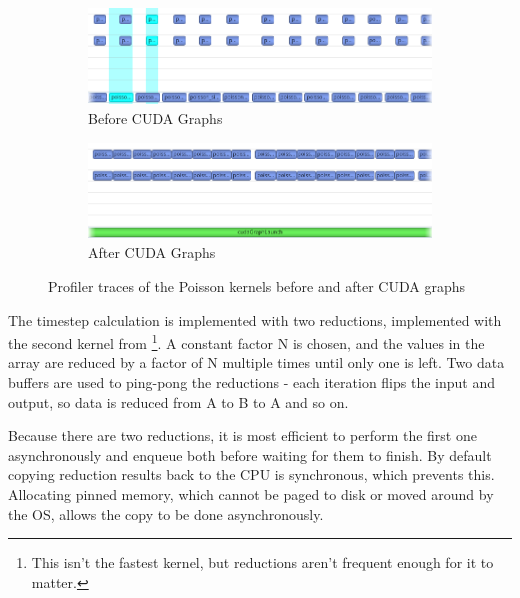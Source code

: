 \begin{figure}
    \centering
    \begin{subfigure}{\textwidth}
        \includegraphics[width=\textwidth]{Ch48Implementation/figures/cudagraphs_before.png}
        \caption{Before CUDA Graphs}
    \end{subfigure}
    \vspace{1cm}
    \begin{subfigure}{\textwidth}
        \includegraphics[width=\textwidth]{Ch48Implementation/figures/cudagraphs_after.png}
        \caption{After CUDA Graphs}
    \end{subfigure}
    \caption{Profiler traces of the Poisson kernels before and after CUDA graphs}
    \label{fig:CudaGraphsImpact}
\end{figure}

The timestep calculation is implemented with two reductions, implemented with the second kernel from \cite{CUDAParallelReduction}\footnote{This isn't the fastest kernel, but reductions aren't frequent enough for it to matter.}.
A constant factor N is chosen, and the values in the array are reduced by a factor of N multiple times until only one is left.
Two data buffers are used to ping-pong the reductions - each iteration flips the input and output, so data is reduced from A to B to A and so on.

Because there are two reductions, it is most efficient to perform the first one asynchronously and enqueue both before waiting for them to finish.
By default copying reduction results back to the CPU is synchronous, which prevents this.
Allocating pinned memory, which cannot be paged to disk or moved around by the OS, allows the copy to be done asynchronously.

